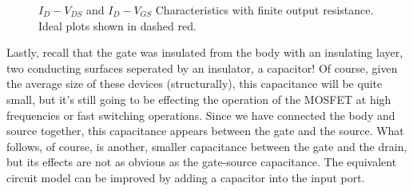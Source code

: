 \documentclass[../main.tex]{subfiles}
\begin{document}
\begin{figure}[H]
{
        }
        \qquad

        \caption{$I_D-V_{DS}$ and $I_D-V_{GS}$ Characteristics with finite output resistance.
                 Ideal plots shown in dashed red.}\label{ro.gph}
    \end{figure}

    \pagebreak
    Lastly, recall that the gate was insulated from the body with an insulating layer, two conducting surfaces 
    seperated by an insulator, a capacitor! Of course, given the average size of these devices (structurally), 
    this capacitance will be quite small, but it's still going to be effecting the operation of the MOSFET at high 
    frequencies or fast switching operations. Since we have connected the body and source together, this capacitance 
    appears between the gate and the source. What follows, of course, is another, smaller capacitance between the gate 
    and the drain, but its effects are not as obvious as the gate-source capacitance. The equivalent circuit model 
    can be improved by adding a capacitor into the input port.
\end{document}
